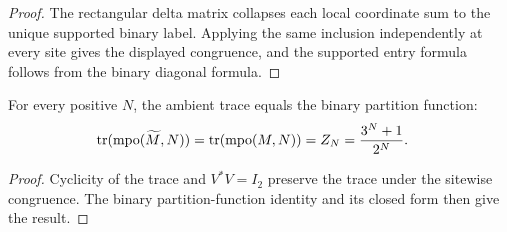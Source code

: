 \begin{proof}
    \leanok
    The rectangular delta matrix collapses each local coordinate sum to the
    unique supported binary label.  Applying the same inclusion independently
    at every site gives the displayed congruence, and the supported entry
    formula follows from the binary diagonal formula.
\end{proof}

\begin{lemma}
    \label{thm:cpsv_example411_ambient_normalization}
    \leanok
    For every positive $N$, the ambient trace equals the binary partition
    function:
    \begin{align}
        \operatorname{tr}(\operatorname{mpo}(\widetilde M,N))
         & =\operatorname{tr}(\operatorname{mpo}(M,N))
        =Z_N=\frac{3^N+1}{2^N}.
        \notag
    \end{align}
\end{lemma}

\begin{proof}
    \leanok
    Cyclicity of the trace and $V^*V=I_2$ preserve the trace under the
    sitewise congruence.  The binary partition-function identity and its closed
    form then give the result.
\end{proof}

